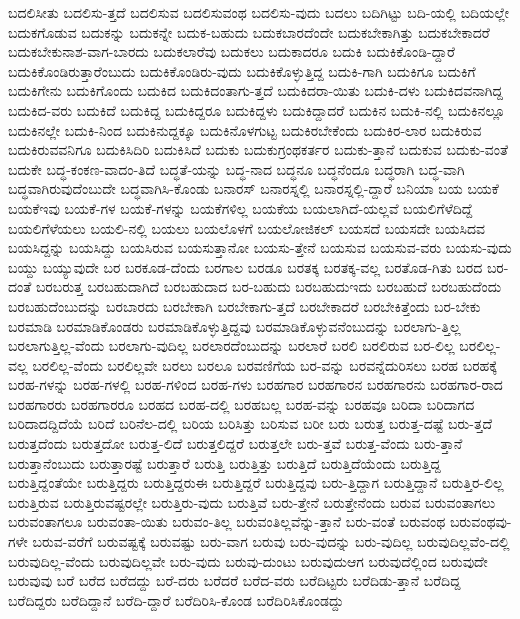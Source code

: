 {ಬದಲಿಸೀತು
ಬದಲಿಸು-ತ್ತದೆ
ಬದಲಿಸುವ
ಬದಲಿಸುವಂಥ
ಬದಲಿಸು-ವುದು
ಬದಲು
ಬದಿಗಿಟ್ಟು
ಬದಿ-ಯಲ್ಲಿ
ಬದಿಯಲ್ಲೇ
ಬದುಕಗೊಡುವ
ಬದುಕನ್ನು
ಬದುಕನ್ನೇ
ಬದುಕ-ಬಹುದು
ಬದುಕಬಾರದೆಂದೇ
ಬದುಕಬೇಕಾಗಿತ್ತು
ಬದುಕಬೇಕಾದರೆ
ಬದುಕಬೇಕುನಾಶ-ವಾಗ-ಬಾರದು
ಬದುಕಲಾರೆವು
ಬದುಕಲು
ಬದುಕಾದರೂ
ಬದುಕಿ
ಬದುಕಿಕೊಂಡಿ-ದ್ದಾರೆ
ಬದುಕಿಕೊಂಡಿರುತ್ತಾರೆಂಬುದು
ಬದುಕಿಕೊಂಡಿರು-ವುದು
ಬದುಕಿಕೊಳ್ಳುತ್ತಿದ್ದ
ಬದುಕಿ-ಗಾಗಿ
ಬದುಕಿಗೂ
ಬದುಕಿಗೆ
ಬದುಕಿಗೇನು
ಬದುಕಿಗೊಂದು
ಬದುಕಿದ
ಬದುಕಿದಂತಾಗು-ತ್ತದೆ
ಬದುಕಿದರಾ-ಯಿತು
ಬದುಕಿ-ದಳು
ಬದುಕಿದವನಾಗಿದ್ದ
ಬದುಕಿದ-ವರು
ಬದುಕಿದೆ
ಬದುಕಿದ್ದ
ಬದುಕಿದ್ದರೂ
ಬದುಕಿದ್ದಳು
ಬದುಕಿದ್ದಾದರೆ
ಬದುಕಿನ
ಬದುಕಿ-ನಲ್ಲಿ
ಬದುಕಿನಲ್ಲೂ
ಬದುಕಿನಲ್ಲೇ
ಬದುಕಿ-ನಿಂದ
ಬದುಕಿನುದ್ದಕ್ಕೂ
ಬದುಕಿನೊಳಗುಟ್ಟ
ಬದುಕಿರಬೇಕೆಂದು
ಬದುಕಿರ-ಲಾರ
ಬದುಕಿರುವ
ಬದುಕಿರುವವನಿಗೂ
ಬದುಕಿಸಿದಿರಿ
ಬದುಕಿಸಿದೆ
ಬದುಕು
ಬದುಕುಗ್ರಂಥಕರ್ತರ
ಬದುಕು-ತ್ತಾನೆ
ಬದುಕುವ
ಬದುಕು-ವಂತೆ
ಬದುಕೇ
ಬದ್ಧ-ಕಂಕಣ-ವಾದಂ-ತಿದೆ
ಬದ್ಧತೆ-ಯನ್ನು
ಬದ್ಧ-ನಾದ
ಬದ್ಧನೂ
ಬದ್ಧನೆಂದೂ
ಬದ್ಧರಾಗಿ
ಬದ್ಧ-ವಾಗಿ
ಬದ್ಧವಾಗಿರುವುದೆಂಬುದೇ
ಬದ್ಧವಾಗಿಸಿ-ಕೊಂಡು
ಬನಾರಸ್
ಬನಾರಸ್ನಲ್ಲಿ
ಬನಾರಸ್ನಲ್ಲಿ-ದ್ದಾರೆ
ಬನಿಯಾ
ಬಯ
ಬಯಕೆ
ಬಯಕೆಇವು
ಬಯಕೆ-ಗಳ
ಬಯಕೆ-ಗಳನ್ನು
ಬಯಕೆಗಳಿಲ್ಲ
ಬಯಕೆಯ
ಬಯಲಾಗಿದೆ-ಯಲ್ಲವೆ
ಬಯಲಿಗೆಳೆದಿದ್ದೆ
ಬಯಲಿಗೆಳೆಯಲು
ಬಯಲಿ-ನಲ್ಲಿ
ಬಯಲು
ಬಯಲೊಳಗೆ
ಬಯಲೋಜಿಕಲ್
ಬಯಸದೆ
ಬಯಸದೇ
ಬಯಸಿದವ
ಬಯಸಿದ್ದನ್ನು
ಬಯಸಿದ್ದು
ಬಯಸಿರುವ
ಬಯಸುತ್ತಾನೋ
ಬಯಸು-ತ್ತೇನೆ
ಬಯಸುವ
ಬಯಸುವ-ವರು
ಬಯಸು-ವುದು
ಬಯ್ದು
ಬಯ್ಯುವುದೇ
ಬರ
ಬರಕೂಡ-ದೆಂದು
ಬರಗಾಲ
ಬರಡೂ
ಬರತಕ್ಕ
ಬರತಕ್ಕ-ವಲ್ಲ
ಬರತೊಡ-ಗಿತು
ಬರದ
ಬರ-ದಂತೆ
ಬರಬರುತ್ತ
ಬರಬಹುದಾಗಿದೆ
ಬರಬಹುದಾದ
ಬರ-ಬಹುದು
ಬರಬಹುದುಇದು
ಬರಬಹುದೆ
ಬರಬಹುದೆಂದು
ಬರಬಹುದೆಂಬುದನ್ನು
ಬರಬಾರದು
ಬರಬೇಕಾಗಿ
ಬರಬೇಕಾಗು-ತ್ತದೆ
ಬರಬೇಕಾದರೆ
ಬರಬೇಕಿತ್ತೆಂದು
ಬರ-ಬೇಕು
ಬರಮಾಡಿ
ಬರಮಾಡಿಕೊಂಡರು
ಬರಮಾಡಿಕೊಳ್ಳುತ್ತಿದ್ದವು
ಬರಮಾಡಿಕೊಳ್ಳುವನೆಂಬುದನ್ನು
ಬರಲಾಗು-ತ್ತಿಲ್ಲ
ಬರಲಾಗುತ್ತಿಲ್ಲ-ವೆಂದು
ಬರಲಾಗು-ವುದಿಲ್ಲ
ಬರಲಾರದೆಂಬುದನ್ನು
ಬರಲಾರೆ
ಬರಲಿ
ಬರಲಿರುವ
ಬರ-ಲಿಲ್ಲ
ಬರಲಿಲ್ಲ-ವಲ್ಲ
ಬರಲಿಲ್ಲ-ವೆಂದು
ಬರಲಿಲ್ಲವೇ
ಬರಲು
ಬರಲೂ
ಬರವಣಿಗೆಯ
ಬರ-ವನ್ನು
ಬರವನ್ನೆದುರಿಸಲು
ಬರಹ
ಬರಹಕ್ಕೆ
ಬರಹ-ಗಳನ್ನು
ಬರಹ-ಗಳಲ್ಲಿ
ಬರಹ-ಗಳಿಂದ
ಬರಹ-ಗಳು
ಬರಹಗಾರ
ಬರಹಗಾರನ
ಬರಹಗಾರನು
ಬರಹಗಾರ-ರಾದ
ಬರಹಗಾರರು
ಬರಹಗಾರರೂ
ಬರಹದ
ಬರಹ-ದಲ್ಲಿ
ಬರಹಬಲ್ಲ
ಬರಹ-ವನ್ನು
ಬರಹವೂ
ಬರಿದಾ
ಬರಿದಾಗದ
ಬರಿದಾದದ್ದಿದೆಯೆ
ಬರಿದೆ
ಬರಿನೆಲ-ದಲ್ಲಿ
ಬರಿಯ
ಬರಿಸಿತ್ತು
ಬರಿಸುವ
ಬರೀ
ಬರು
ಬರುತ್ತ
ಬರುತ್ತ-ದಷ್ಟೆ
ಬರು-ತ್ತದೆ
ಬರುತ್ತದೆಂದು
ಬರುತ್ತದೋ
ಬರುತ್ತ-ಲಿದೆ
ಬರುತ್ತಲಿದ್ದರೆ
ಬರುತ್ತಲೇ
ಬರು-ತ್ತವೆ
ಬರುತ್ತ-ವೆಂದು
ಬರು-ತ್ತಾನೆ
ಬರುತ್ತಾನೆಂಬುದು
ಬರುತ್ತಾರಷ್ಟೆ
ಬರುತ್ತಾರೆ
ಬರುತ್ತಿ
ಬರುತ್ತಿತ್ತು
ಬರುತ್ತಿದೆ
ಬರುತ್ತಿದೆಯೆಂದು
ಬರುತ್ತಿದ್ದ
ಬರುತ್ತಿದ್ದಂತೆಯೇ
ಬರುತ್ತಿದ್ದರು
ಬರುತ್ತಿದ್ದರುಈ
ಬರುತ್ತಿದ್ದರೆ
ಬರುತ್ತಿದ್ದವು
ಬರು-ತ್ತಿದ್ದಾಗ
ಬರುತ್ತಿದ್ದಾನೆ
ಬರುತ್ತಿರ-ಲಿಲ್ಲ
ಬರುತ್ತಿರುವ
ಬರುತ್ತಿರುವಷ್ಟರಲ್ಲೇ
ಬರುತ್ತಿರು-ವುದು
ಬರುತ್ತಿವೆ
ಬರು-ತ್ತೇನೆ
ಬರುತ್ತೇನೆಂದು
ಬರುವ
ಬರುವಂತಾಗಲು
ಬರುವಂತಾಗಲೂ
ಬರುವಂತಾ-ಯಿತು
ಬರುವಂ-ತಿಲ್ಲ
ಬರುವಂತಿಲ್ಲವೆನ್ನು-ತ್ತಾನೆ
ಬರು-ವಂತೆ
ಬರುವಂಥ
ಬರುವಂಥವು-ಗಳೇ
ಬರುವ-ವರೆಗೆ
ಬರುವಷ್ಟಕ್ಕೆ
ಬರುವಷ್ಟು
ಬರು-ವಾಗ
ಬರುವು
ಬರು-ವುದನ್ನು
ಬರು-ವುದಿಲ್ಲ
ಬರುವುದಿಲ್ಲವೆಂ-ದಲ್ಲಿ
ಬರುವುದಿಲ್ಲ-ವೆಂದು
ಬರುವುದಿಲ್ಲವೇ
ಬರು-ವುದು
ಬರುವು-ದುಂಟು
ಬರುವುದುಆಗ
ಬರುವುದೆಲ್ಲಿಂದ
ಬರುವುದೇ
ಬರುವುವು
ಬರೆ
ಬರೆದ
ಬರೆದದ್ದು
ಬರೆ-ದರು
ಬರೆದರೆ
ಬರೆದ-ವರು
ಬರೆದಿಟ್ಟರು
ಬರೆದಿಡು-ತ್ತಾನೆ
ಬರೆದಿದ್ದ
ಬರೆದಿದ್ದರು
ಬರೆದಿದ್ದಾನೆ
ಬರೆದಿ-ದ್ದಾರೆ
ಬರೆದಿರಿಸಿ-ಕೊಂಡ
ಬರೆದಿರಿಸಿಕೊಂಡದ್ದು
}
